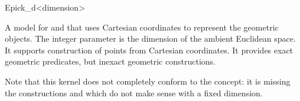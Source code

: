 \begin{ccRefClass}{Epick_d<dimension>}


\ccDefinition
A model for  and  that
uses Cartesian coordinates to represent the geometric objects.  The
integer parameter  is the dimension of the ambient
Euclidean space. It supports construction of points from 
Cartesian coordinates. It provides exact geometric predicates, but
inexact geometric constructions.

Note that this kernel does not completely conform to the 
concept: it is missing the constructions  and
 which do not make sense with a fixed
dimension.

\ccIsModel
{}


\ccSeeAlso
{}



\end{ccRefClass}
